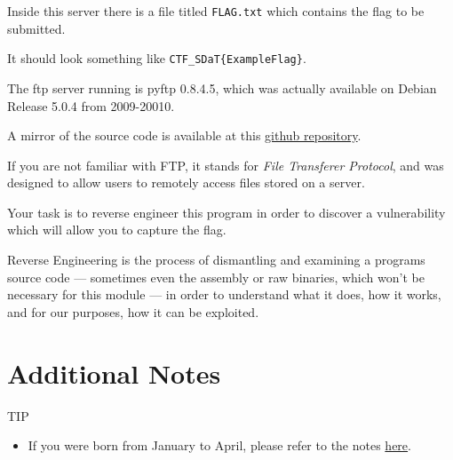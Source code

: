 {{{Inside this server there is a file titled \lstinline`FLAG.txt` which contains the flag to be submitted. %



It should look something like \lstinline`CTF_SDaT{ExampleFlag}`. %



The ftp server running is pyftp 0.8.4.5, which was actually available on Debian Release 5.0.4 from 2009-20010. %



A mirror of the source code is available at this \href{https://github.com/brendonky18/pyftpd-0.8.4.5_mirror}{github repository}.







                    If you are not familiar with FTP, it stands for \textit{File Transferer Protocol}, and was designed to allow users to remotely access files stored on a server. 







                    Your task is to reverse engineer this program in order to discover a vulnerability which will allow you to capture the flag.







                    Reverse Engineering is the process of dismantling and examining a programs source code — sometimes even the assembly or raw binaries, which won't be necessary for this module — in order to understand what it does, how it works, and for our purposes, how it can be exploited.



                \section*{Additional Notes}



                    TIP



                    \begin{itemize}



                        \item If you were born from January to April, please refer to the notes \href{https://github.com/brendonky18/Honors-Thesis.CTFs/blob/main/going-backwards/notes_0.md}{here}.




\end{itemize}}}}
